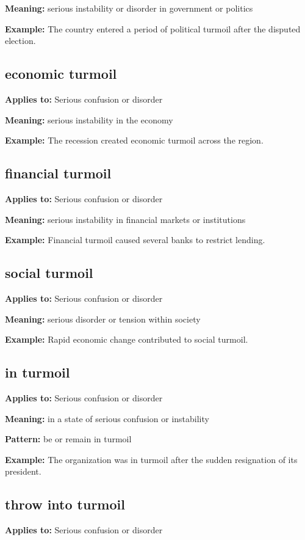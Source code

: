 \documentclass[11pt]{article}
\begin{document}
\textbf{Meaning:} serious instability or disorder in government or politics

\textbf{Example:} The country entered a period of political turmoil after the disputed election.

\subsection{economic turmoil}
\textbf{Applies to:} Serious confusion or disorder

\textbf{Meaning:} serious instability in the economy

\textbf{Example:} The recession created economic turmoil across the region.

\subsection{financial turmoil}
\textbf{Applies to:} Serious confusion or disorder

\textbf{Meaning:} serious instability in financial markets or institutions

\textbf{Example:} Financial turmoil caused several banks to restrict lending.

\subsection{social turmoil}
\textbf{Applies to:} Serious confusion or disorder

\textbf{Meaning:} serious disorder or tension within society

\textbf{Example:} Rapid economic change contributed to social turmoil.

\subsection{in turmoil}
\textbf{Applies to:} Serious confusion or disorder

\textbf{Meaning:} in a state of serious confusion or instability

\textbf{Pattern:} be or remain in turmoil

\textbf{Example:} The organization was in turmoil after the sudden resignation of its president.

\subsection{throw into turmoil}
\textbf{Applies to:} Serious confusion or disorder
\end{document}
